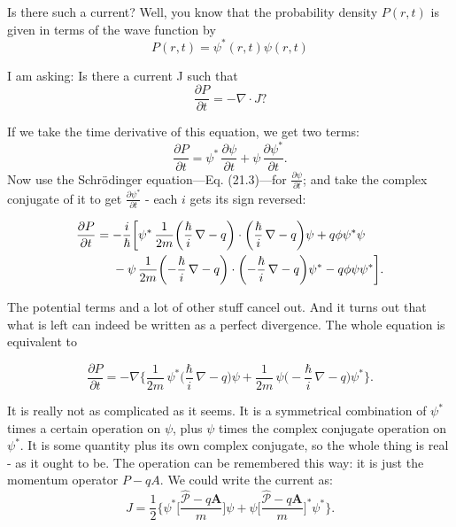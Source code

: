 \documentclass[a4paper,11pt]{article}
\newcommand{\ddp}[2]{\frac{\partial #1}{\partial #2 }}
\begin{document}
Is there such a current? Well, you know that the probability density $P(r,t)$ is given in terms of the wave function by
\begin{equation}
P(r,t)=\psi^*(r,t)\psi(r,t)    
\end{equation}

I am asking: Is there a current J such that
\begin{equation}
    \ddp{P}{t} = -\nabla \cdot J?
\end{equation}

If we take the time derivative of this equation, we get two terms:
\begin{equation}
\ddp{P}{t}=\psi^*\,\ddp{\psi}{t}+\psi\,\ddp{\psi^*}{t}.
\end{equation}
Now use the Schrödinger equation—Eq. (21.3)—for $\ddp{\psi}{t}$; and take the complex conjugate of it to get $\ddp{\psi^*}{t}$ - each $i$ gets its sign reversed:

\begin{equation}
\begin{aligned}
\ddp{P}{t}&=-\frac{i}{\hbar}\biggl[\psi^*\,\frac{1}{2m}
\biggl(\frac{\hbar}{i}\,\nabla-q\biggr)\cdot
\biggl(\frac{\hbar}{i}\,\nabla-q\biggr)\psi+
q\phi\psi^*\psi\\
&\hphantom{{}={}}-\psi\,\frac{1}{2m}
\biggl(-\frac{\hbar}{i}\,\nabla-q\biggr)\cdot
\biggl(-\frac{\hbar}{i}\,\nabla-q\biggr)\psi^*
-q\phi\psi\psi^*\biggr].
\end{aligned}
\end{equation}

The potential terms and a lot of other stuff cancel out. And it turns out that what is left can indeed be written as a perfect divergence. The whole equation is equivalent to

\begin{equation}
\ddp{P}{t}=-\nabla{\biggl \lbrace
\frac{1}{2m}\,\psi^*
\biggl(\frac{\hbar}{i}\,\nabla-q\biggr)\psi+
\frac{1}{2m}\,\psi
\biggl(-\frac{\hbar}{i}\,\nabla-q\biggr)\psi^*
\biggr \rbrace}.
\end{equation}

It is really not as complicated as it seems. It is a symmetrical combination of $\psi^*$ times a certain operation on $\psi$, plus $\psi$ times the complex conjugate operation on $\psi^*$. It is some quantity plus its own complex conjugate, so the whole thing is real - as it ought to be. The operation can be remembered this way: it is just the momentum operator $P - qA$. We could write the current as:
\begin{equation}
\label{eq:current}
J =\frac{1}{2}\biggl \lbrace
\psi^*\biggl[\frac{\hat{\mathcal{P}}-q \mathbf{A}}{m}\biggr]\psi+
\psi\biggl[\!\frac{\hat{\mathcal{P}}-q \mathbf{A}}{m}\biggr]^*\psi^*
\biggr \rbrace.
\end{equation}
\end{document}

